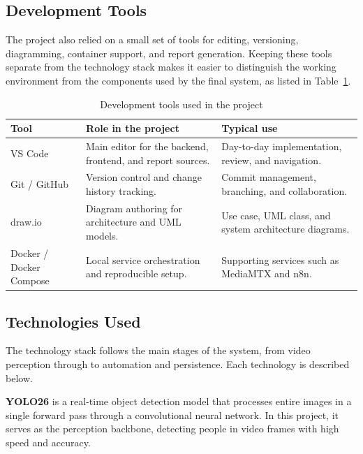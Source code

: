 \subsection{Development Tools}
The project also relied on a small set of tools for editing, versioning, diagramming, container support, and report generation. Keeping these tools separate from the technology stack makes it easier to distinguish the working environment from the components used by the final system, as listed in Table~\ref{tab:development_tools}.
\begin{table}[H]
    \centering
    \begingroup\setlength{\tabcolsep}{4pt}\renewcommand{\arraystretch}{0.95}\footnotesize
    \begin{tabularx}{\textwidth}{|l|X|X|}
        \hline
        Tool & Role in the project & Typical use \\ \hline
        VS Code \cite{vscode_docs} & Main editor for the backend, frontend, and report sources. & Day-to-day implementation, review, and navigation. \\ \hline
        Git / GitHub \cite{git_docs,github_docs} & Version control and change history tracking. & Commit management, branching, and collaboration. \\ \hline
        draw.io \cite{drawio_docs} & Diagram authoring for architecture and UML models. & Use case, UML class, and system architecture diagrams. \\ \hline
        Docker / Docker Compose \cite{docker_docs} & Local service orchestration and reproducible setup. & Supporting services such as MediaMTX and n8n. \\ \hline
    \end{tabularx}
    \caption{Development tools used in the project}
    \label{tab:development_tools}
    \endgroup
\end{table}

\subsection{Technologies Used}
The technology stack follows the main stages of the system, from video perception through to automation and persistence. Each technology is described below.

\textbf{YOLO26} \cite{ultralytics_docs} is a real-time object detection model that processes entire images in a single forward pass through a convolutional neural network. In this project, it serves as the perception backbone, detecting people in video frames with high speed and accuracy.


